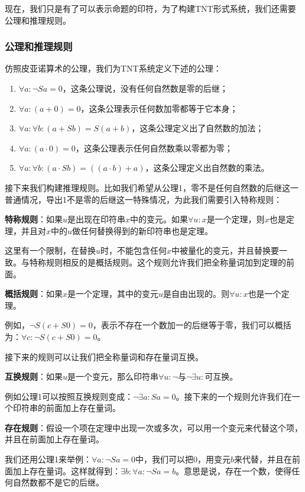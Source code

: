 \documentclass{article}
\begin{document}
现在，我们只是有了可以表示命题的印符，为了构建TNT形式系统，我们还需要公理和推理规则。

\subsubsection{公理和推理规则}

仿照皮亚诺算术的公理，我们为TNT系统定义下述的公理：

\begin{enumerate}
\item $\forall a : \lnot Sa = 0$，这条公理说，没有任何自然数是零的后继；
\item $\forall a: (a + 0) = 0$，这条公理表示任何数加零都等于它本身；
\item $\forall a: \forall b: (a + Sb) = S(a + b)$，这条公理定义出了自然数的加法；
\item $\forall a: (a \cdot 0) = 0$，这条公理表示任何自然数乘以零都为零；
\item $\forall a: \forall b: (a \cdot Sb) = ((a \cdot b) + a)$，这条公理定义出自然数的乘法。
\end{enumerate}

接下来我们构建推理规则。比如我们希望从公理1，零不是任何自然数的后继这一普通情况，导出1不是零的后继这一特殊情况，为此我们需要引入特称规则：

\textbf{特称规则}：如果$u$是出现在印符串$x$中的变元。如果$\forall u: x$是一个定理，则$x$也是定理，并且对$x$中的$u$做任何替换得到的新印符串也是定理。

这里有一个限制，在替换$u$时，不能包含任何$x$中被量化的变元，并且替换要一致。与特称规则相反的是概括规则。这个规则允许我们把全称量词加到定理的前面。

\textbf{概括规则}：如果$x$是一个定理，其中的变元$u$是自由出现的。则$\forall u: x$也是一个定理。

例如，$\lnot S(c + S0) = 0$，表示不存在一个数加一的后继等于零，我们可以概括为：$\forall c: \lnot S(c + S0) = 0$。

接下来的规则可以让我们把全称量词和存在量词互换。

\textbf{互换规则}：如果$u$是一个变元，那么印符串$\forall u: \lnot $与$\lnot \exists u:$可互换。

例如公理1可以按照互换规则变成：$\lnot \exists a: Sa = 0$。接下来的一个规则允许我们在一个印符串的前面加上存在量词。

\textbf{存在规则}：假设一个项在定理中出现一次或多次，可以用一个变元来代替这个项，并且在前面加上存在量词。

我们还用公理1来举例：$\forall a: \lnot Sa = 0$中，我们可以把0，用变元$b$来代替，并且在前面加上存在量词。这样就得到：$\exists b: \forall a: \lnot Sa = b$。意思是说，存在一个数，使得任何自然数都不是它的后继。
\end{document}
